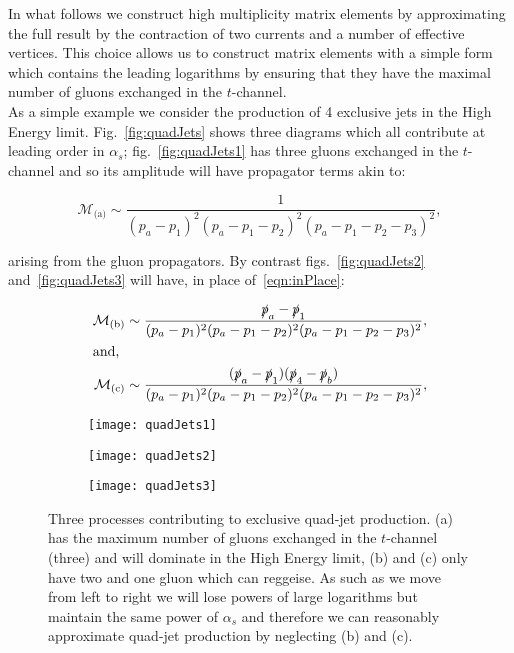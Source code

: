 	In what follows we construct high multiplicity matrix elements by approximating the full result
	by the contraction of two currents and a number of effective vertices.  This choice allows us
	to construct matrix elements with a simple form which contains the leading logarithms by
	ensuring that they have the maximal number of gluons exchanged in the $t$-channel.\\
	As a simple example we consider the production of 4 exclusive jets in the High Energy limit.
	Fig.~\eqref{fig:quadJets} shows three diagrams which all contribute at leading order in $\alpha_s$;
	fig.~\eqref{fig:quadJets1} has three gluons exchanged in the $t$-channel and so its amplitude will
	have propagator terms akin to:

	\begin{equation}
		\mathcal{M}_{\text{(a)}}\sim\frac{1}{(p_a - p_1)^2(p_a - p_1 - p_2)^2(p_a - p_1 - p_2 - p_3)^2},
		\label{eqn:inPlace}
	\end{equation}

	arising from the gluon propagators.  By contrast figs.~\eqref{fig:quadJets2} and~\eqref{fig:quadJets3} will
	have, in place of~\eqref{eqn:inPlace}:

	\begin{align}
		\mathcal{M}_{\text{(b)}}\sim\frac{\slashed p_a - \slashed p_1}
		{(p_a - p_1)^2(p_a - p_1 - p_2)^2(p_a - p_1 - p_2 - p_3)^2},\\
		\intertext{and,}
		\mathcal{M}_{\text{(c)}}\sim\frac{(\slashed p_a - \slashed p_1)(\slashed p_4 - \slashed p_b)}
		{(p_a - p_1)^2(p_a - p_1 - p_2)^2(p_a - p_1 - p_2 - p_3)^2},
	\end{align}

	\begin{figure}[bt]

		\centering

		\begin{subfigure}[b]{0.31\textwidth}
			\texttt{[image: quadJets1]}
			\caption{}
			\label{fig:quadJets1}
		\end{subfigure}
		\begin{subfigure}[b]{0.31\textwidth}
			\texttt{[image: quadJets2]}
			\caption{}
			\label{fig:quadJets2}
		\end{subfigure}
		\begin{subfigure}[b]{0.31\textwidth}
			\texttt{[image: quadJets3]}
			\caption{}
			\label{fig:quadJets3}
		\end{subfigure}

		\caption{Three processes contributing to exclusive quad-jet production. (a) has the
		maximum number of gluons exchanged in the $t$-channel (three) and will dominate in the High
		Energy limit, (b) and (c) only have two and one gluon which can reggeise.  As such as we move
		from left to right we will lose powers of large logarithms but maintain the same power of
		$\alpha_s$ and therefore we can reasonably approximate quad-jet production by neglecting
		(b) and (c).}
		\label{fig:quadJets}
	\end{figure}

